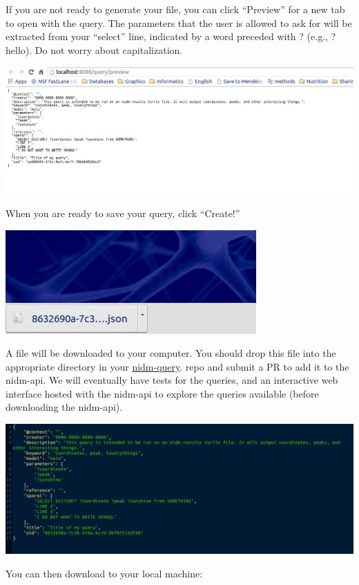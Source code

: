 \documentclass[letterpaper,10pt,english]{sphinxmanual}
\begin{document}
If you are not ready to generate your file, you can click ``Preview'' for a new tab to open with the query. The parameters that the user is allowed to ask for will be extracted from your ``select'' line, indicated by a word preceded with ? (e.g., ?hello). Do not worry about capitalization.

\includegraphics{queryPreview.png}

When you are ready to save your query, click ``Create!''

\includegraphics{queryDownload1.png}

A file will be downloaded to your computer. You should drop this file into the appropriate directory in your \href{https://github.com/incf-nidash/nidm-query}{nidm-query}. repo and submit a PR to add it to the nidm-api. We will eventually have tests for the queries, and an interactive web interface hosted with the nidm-api to explore the queries available (before downloading the nidm-api).

\includegraphics{queryDownload2.png}

You can then download to your local machine:
\end{document}
